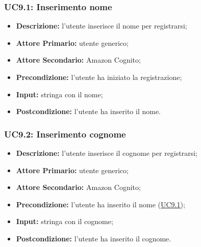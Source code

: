 \subsubsection{UC9.1: Inserimento nome}
\label{sec:UC9.1}
\begin{itemize}
    \item \textbf{Descrizione:} l'utente inserisce il nome per registrarsi;
    \item \textbf{Attore Primario:} utente generico;
    \item \textbf{Attore Secondario:} Amazon Cognito;
    \item \textbf{Precondizione:} l'utente ha iniziato la registrazione;
    \item \textbf{Input:} stringa con il nome;
    \item \textbf{Postcondizione:} l'utente ha inserito il nome.
\end{itemize}

\subsubsection{UC9.2: Inserimento cognome}
\label{sec:UC9.2}
\begin{itemize}
    \item \textbf{Descrizione:} l'utente inserisce il cognome per registrarsi;
    \item \textbf{Attore Primario:} utente generico;
    \item \textbf{Attore Secondario:} Amazon Cognito;
    \item \textbf{Precondizione:} l'utente ha inserito il nome (\hyperref[sec:UC9.1]{\underline{UC9.1}});
    \item \textbf{Input:} stringa con il cognome;
    \item \textbf{Postcondizione:} l'utente ha inserito il cognome.
\end{itemize}

